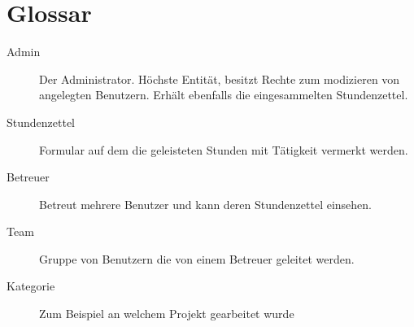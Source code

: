 \section{Glossar}
\begin{description}
	\item[Admin] Der Administrator. Höchste Entität, besitzt Rechte zum modizieren von angelegten Benutzern.
	               Erhält ebenfalls die eingesammelten Stundenzettel.

	\item[Stundenzettel] Formular auf dem die geleisteten Stunden mit Tätigkeit vermerkt werden.

	\item[Betreuer] Betreut mehrere Benutzer und kann deren Stundenzettel einsehen.

	\item[Team] Gruppe von Benutzern die von einem Betreuer geleitet werden.

	\item[Kategorie] Zum Beispiel an welchem Projekt gearbeitet wurde
\end{description}
